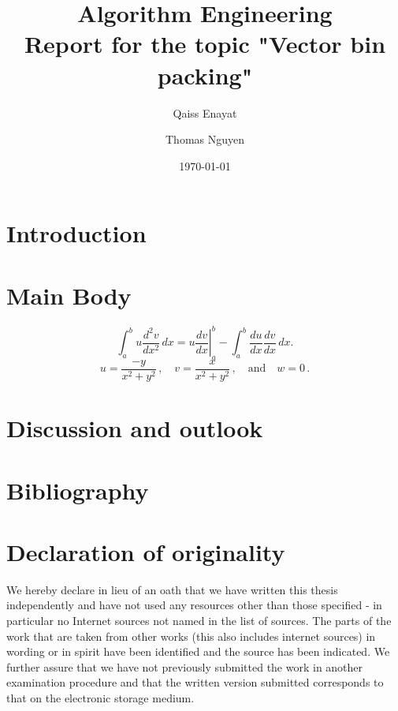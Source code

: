 \documentclass[a4paper,11pt,titlepage]{article}
\begin{document}
\begin{titlepage}
    \title{Algorithm Engineering\\Report for the topic "Vector bin packing"}
    \author{Qaiss Enayat \and Thomas Nguyen}
    \date{\today}
\end{titlepage}
\maketitle
\tableofcontents
\pagebreak
\section{Introduction}
\lipsum[1-5]
\section{Main Body}
\lipsum[5-7]
\[
\int_a^bu\frac{d^2v}{dx^2}\,dx
=\left.u\frac{dv}{dx}\right|_a^b
-\int_a^b\frac{du}{dx}\frac{dv}{dx}\,dx.
\]
\lipsum[8]
\[
u=\frac{-y}{x^2+y^2}\,,\quad
v=\frac{x}{x^2+y^2}\,,\quad\text{and}\quad
w=0\,.
\]
\lipsum[1-3]
\section{Discussion and outlook}
\lipsum[1-4]
\section{Bibliography}
\lipsum[1-2]
\section{Declaration of originality}
We hereby declare in lieu of an oath that we have written this thesis independently and have not used any resources other than those specified - in particular no Internet sources not named in the list of sources. The parts of the work that are taken from other works (this also includes internet sources) in wording or in spirit have been identified and the source has been indicated. We further assure that we have not previously submitted the work in another examination procedure and that the written version submitted corresponds to that on the electronic storage medium.
\end{document}
